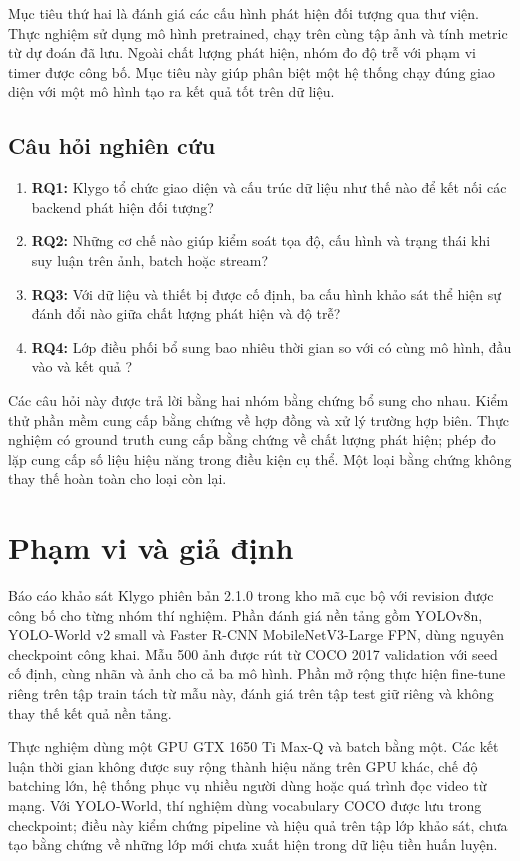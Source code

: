 Mục tiêu thứ hai là đánh giá các cấu hình phát hiện đối tượng qua thư viện. Thực nghiệm sử dụng mô hình pretrained, chạy trên cùng tập ảnh và tính metric từ dự đoán đã lưu. Ngoài chất lượng phát hiện, nhóm đo độ trễ với phạm vi timer được công bố. Mục tiêu này giúp phân biệt một hệ thống chạy đúng giao diện với một mô hình tạo ra kết quả tốt trên dữ liệu.

\subsection{Câu hỏi nghiên cứu}
\begin{enumerate}
\item \textbf{RQ1:} Klygo tổ chức giao diện và cấu trúc dữ liệu như thế nào để kết nối các backend phát hiện đối tượng?
\item \textbf{RQ2:} Những cơ chế nào giúp kiểm soát tọa độ, cấu hình và trạng thái khi suy luận trên ảnh, batch hoặc stream?
\item \textbf{RQ3:} Với dữ liệu và thiết bị được cố định, ba cấu hình khảo sát thể hiện sự đánh đổi nào giữa chất lượng phát hiện và độ trễ?
\item \textbf{RQ4:} Lớp điều phối  bổ sung bao nhiêu thời gian so với  có cùng mô hình, đầu vào và kết quả ?
\end{enumerate}
Các câu hỏi này được trả lời bằng hai nhóm bằng chứng bổ sung cho nhau. Kiểm thử phần mềm cung cấp bằng chứng về hợp đồng và xử lý trường hợp biên. Thực nghiệm có ground truth cung cấp bằng chứng về chất lượng phát hiện; phép đo lặp cung cấp số liệu hiệu năng trong điều kiện cụ thể. Một loại bằng chứng không thay thế hoàn toàn cho loại còn lại.

\section{Phạm vi và giả định}
Báo cáo khảo sát Klygo phiên bản 2.1.0 trong kho mã cục bộ với revision được công bố cho từng nhóm thí nghiệm. Phần đánh giá nền tảng gồm YOLOv8n, YOLO-World v2 small và Faster R-CNN MobileNetV3-Large FPN, dùng nguyên checkpoint công khai. Mẫu 500 ảnh được rút từ COCO 2017 validation với seed cố định, cùng nhãn và ảnh cho cả ba mô hình. Phần mở rộng thực hiện fine-tune riêng trên tập train tách từ mẫu này, đánh giá trên tập test giữ riêng và không thay thế kết quả nền tảng.

Thực nghiệm dùng một GPU GTX 1650 Ti Max-Q và batch bằng một. Các kết luận thời gian không được suy rộng thành hiệu năng trên GPU khác, chế độ batching lớn, hệ thống phục vụ nhiều người dùng hoặc quá trình đọc video từ mạng. Với YOLO-World, thí nghiệm dùng vocabulary COCO được lưu trong checkpoint; điều này kiểm chứng pipeline và hiệu quả trên tập lớp khảo sát, chưa tạo bằng chứng về những lớp mới chưa xuất hiện trong dữ liệu tiền huấn luyện.

